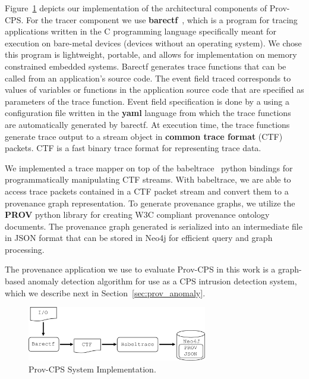 Figure~\ref{figure} depicts our implementation of the architectural components of Prov-CPS. For the tracer component we use \textbf{barectf}~\cite{barectf}, which is a program for tracing applications written in the C programming language specifically meant for execution on bare-metal devices (devices without an operating system). We chose this program is lightweight, portable, and allows for implementation on memory constrained embedded systems.
%
%
Barectf generates trace functions that can be called from an application's source code. The event field traced corresponds to values of variables or functions in the application source code that are specified as parameters of the trace function. 
%
%
%
%
Event field specification is done by a using a configuration file written in the \textbf{yaml} language from which the trace functions are automatically generated by barectf. At execution time, the trace functions generate trace output to a stream object in \textbf{common trace format} (CTF)~\cite{ctf} packets. CTF is a fast binary trace format for representing trace data.

We implemented a trace mapper on top of the babeltrace~\cite{babeltrace} python bindings for programmatically manipulating CTF streams. With babeltrace, we are able to access trace packets contained in a CTF packet stream and convert them to a provenance graph representation. To generate provenance graphs, we utilize the \textbf{PROV} python library for creating W3C compliant provenance ontology documents. The provenance graph generated is serialized into an intermediate file in JSON format that can be stored in Neo4j for efficient query and graph processing.

The provenance application we use to evaluate Prov-CPS in this work is a graph-based anomaly detection algorithm for use as a CPS intrusion detection system, which we describe next in Section~\ref{sec:prov_anomaly}.

 \begin{figure}[h!]
\begin{center}
\includegraphics[width=0.7\textwidth]{system_implementation_v4.pdf}
\end{center}
\caption{Prov-CPS System Implementation.}
\label{figure}
\end{figure}





 